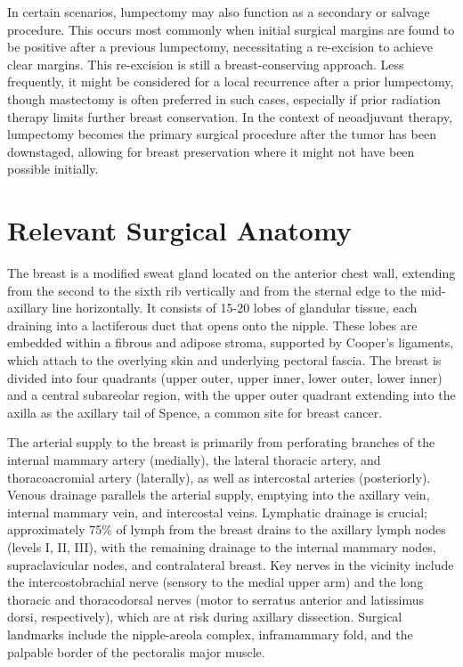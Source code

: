 In certain scenarios, lumpectomy may also function as a secondary or salvage procedure. This occurs most commonly when initial surgical margins are found to be positive after a previous lumpectomy, necessitating a re-excision to achieve clear margins. This re-excision is still a breast-conserving approach. Less frequently, it might be considered for a local recurrence after a prior lumpectomy, though mastectomy is often preferred in such cases, especially if prior radiation therapy limits further breast conservation. In the context of neoadjuvant therapy, lumpectomy becomes the primary surgical procedure after the tumor has been downstaged, allowing for breast preservation where it might not have been possible initially.

\section*{Relevant Surgical Anatomy}
The breast is a modified sweat gland located on the anterior chest wall, extending from the second to the sixth rib vertically and from the sternal edge to the mid-axillary line horizontally. It consists of 15-20 lobes of glandular tissue, each draining into a lactiferous duct that opens onto the nipple. These lobes are embedded within a fibrous and adipose stroma, supported by Cooper's ligaments, which attach to the overlying skin and underlying pectoral fascia. The breast is divided into four quadrants (upper outer, upper inner, lower outer, lower inner) and a central subareolar region, with the upper outer quadrant extending into the axilla as the axillary tail of Spence, a common site for breast cancer.

The arterial supply to the breast is primarily from perforating branches of the internal mammary artery (medially), the lateral thoracic artery, and thoracoacromial artery (laterally), as well as intercostal arteries (posteriorly). Venous drainage parallels the arterial supply, emptying into the axillary vein, internal mammary vein, and intercostal veins. Lymphatic drainage is crucial; approximately 75\% of lymph from the breast drains to the axillary lymph nodes (levels I, II, III), with the remaining drainage to the internal mammary nodes, supraclavicular nodes, and contralateral breast. Key nerves in the vicinity include the intercostobrachial nerve (sensory to the medial upper arm) and the long thoracic and thoracodorsal nerves (motor to serratus anterior and latissimus dorsi, respectively), which are at risk during axillary dissection. Surgical landmarks include the nipple-areola complex, inframammary fold, and the palpable border of the pectoralis major muscle.

